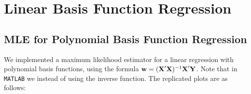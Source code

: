 
\section{Linear Basis Function Regression}\label{sec:lin_basis_fn_reg}

\subsection{MLE for Polynomial Basis Function Regression}
We implemented a maximum likelihood estimator for a linear regression with polynomial basis functions, using the formula $\boldsymbol{\mathbf{w}} = (\boldsymbol{\mathbf{X}}'\boldsymbol{\mathbf{X}})^{-1} \boldsymbol{\mathbf{X}}'\boldsymbol{\mathbf{Y}}$. Note that in \texttt{MATLAB} we instead of using the inverse function. The replicated plots are as follows: